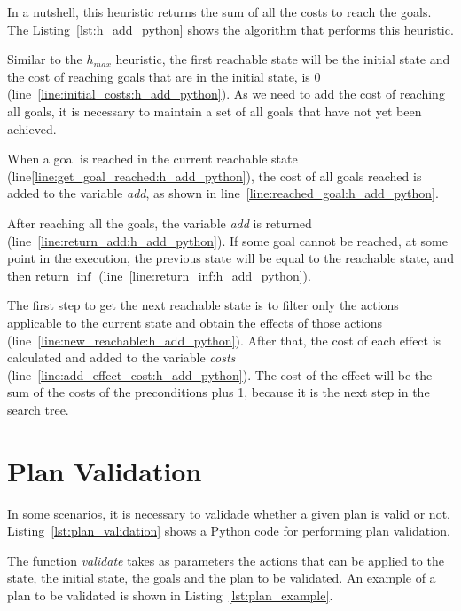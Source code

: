 \documentclass[letterpaper]{article}
\begin{document}
In a nutshell, this heuristic returns the sum of all the costs to reach the goals. The Listing~\ref{lst:h_add_python} shows the algorithm that performs this heuristic.



Similar to the $h_{max}$ heuristic, the first reachable state will be the initial state and the cost of reaching goals that are in the initial state, is $0$ (line~\ref{line:initial_costs:h_add_python}). As we need to add the cost of reaching all goals, it is necessary to maintain a set of all goals that have not yet been achieved.

When a goal is reached in the current reachable state (line\ref{line:get_goal_reached:h_add_python}), the cost of all goals reached is added to the variable \textit{add}, as shown in line~\ref{line:reached_goal:h_add_python}.

After reaching all the goals, the variable \textit{add} is returned (line~\ref{line:return_add:h_add_python}). If some goal cannot be reached, at some point in the execution, the previous state will be equal to the reachable state, and then return $\inf$ (line~\ref{line:return_inf:h_add_python}).

The first step to get the next reachable state is to filter only the actions applicable to the current state and obtain the effects of those actions (line~\ref{line:new_reachable:h_add_python}). After that, the cost of each effect is calculated and added to the variable \textit{costs} (line~\ref{line:add_effect_cost:h_add_python}). The cost of the effect will be the sum of the costs of the preconditions plus 1, because it is the next step in the search tree.


\section{Plan Validation}

In some scenarios, it is necessary to validade whether a given plan is valid or not. Listing~\ref{lst:plan_validation} shows a Python code for performing plan validation.



The function \textit{validate} takes as parameters the actions that can be applied to the state, the initial state, the goals and the plan to be validated. An example of a plan to be validated is shown in Listing~\ref{lst:plan_example}.
\end{document}
